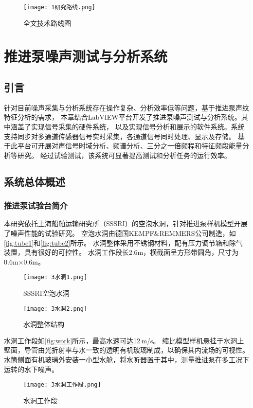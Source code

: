 \quad
\begin{figure}[htbp]
    \centering
    \texttt{[image: 1研究路线.png]}
    \caption{\label{fig:jishuluxian}全文技术路线图}
\end{figure}

\chapter{推进泵噪声测试与分析系统}
\section{引言}
针对目前噪声采集与分析系统存在操作复杂、分析效率低等问题，基于推进泵声纹特征分析的需求，
本章结合LabVIEW平台开发了推进泵噪声测试与分析系统。其中涵盖了实现信号采集的硬件系统，
以及实现信号分析和展示的软件系统。系统支持同步对多通道传感器信号实时采集，各通道信号同时处理、显示及存储。
基于此平台可开展对声信号时域分析、频谱分析、三分之一倍频程和特征频段能量分析等研究。
经过试验测试，该系统可显著提高测试和分析任务的运行效率。
\section{系统总体概述}
\subsection{推进泵试验台简介}
本研究依托上海船舶运输研究所（SSSRI）的空泡水洞，针对推进泵样机模型开展了噪声性能的试验研究。
空泡水洞由德国KEMPF\&REMMERS公司制造，如\autoref{fig:tube1}和\autoref{fig:tube2}所示。
水洞整体采用不锈钢材料，配有压力调节箱和除气装置，具有很好的可控性。
水洞工作段长2.6m，横截面呈方形带圆角，尺寸为0.6m×0.6m。
\begin{figure}[htbp]
    \centering
    \texttt{[image: 3水洞1.png]}
    \caption{\label{fig:tube1}SSSRI空泡水洞}
\end{figure}
\begin{figure}[htbp]
    \centering
    \texttt{[image: 3水洞2.png]}
    \caption{\label{fig:tube2}水洞整体结构}
\end{figure}

水洞工作段如\autoref{fig:work}所示，最高水速可达12\,m/s。
缩比模型样机悬挂于水洞上壁面，导管由光折射率与水一致的透明有机玻璃制成，以确保其内流场的可视性。
水筒侧面有机玻璃外安装一小型水舱，将水听器置于其中，测量推进泵在多工况下运转的水下噪声。
\begin{figure}[htbp]
    \centering
    \texttt{[image: 3水洞工作段.png]}
    \caption{\label{fig:work}水洞工作段}
\end{figure}

